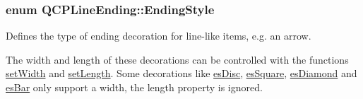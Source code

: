 \subsubsection[{\texorpdfstring{Ending\+Style}{EndingStyle}}]{\setlength{\rightskip}{0pt plus 5cm}enum {\bf Q\+C\+P\+Line\+Ending\+::\+Ending\+Style}}\hypertarget{class_q_c_p_line_ending_a5ef16e6876b4b74959c7261d8d4c2cd5}{}\label{class_q_c_p_line_ending_a5ef16e6876b4b74959c7261d8d4c2cd5}
Defines the type of ending decoration for line-\/like items, e.\+g. an arrow.



The width and length of these decorations can be controlled with the functions \hyperlink{class_q_c_p_line_ending_a26dc020ea985a72cc25881ce2115e34e}{set\+Width} and \hyperlink{class_q_c_p_line_ending_ae36fa01763751cd64b7f56c3507e935a}{set\+Length}. Some decorations like \hyperlink{class_q_c_p_line_ending_a5ef16e6876b4b74959c7261d8d4c2cd5a4e7a48003d59b1eed00767e879440600}{es\+Disc}, \hyperlink{class_q_c_p_line_ending_a5ef16e6876b4b74959c7261d8d4c2cd5a8b0298e645008220cbc6cef9d05eb950}{es\+Square}, \hyperlink{class_q_c_p_line_ending_a5ef16e6876b4b74959c7261d8d4c2cd5a0a9e21dfaf144c9b8ae41711f61199e3}{es\+Diamond} and \hyperlink{class_q_c_p_line_ending_a5ef16e6876b4b74959c7261d8d4c2cd5a1683a6a39898f53737ee21d4fedba791}{es\+Bar} only support a width, the length property is ignored.

